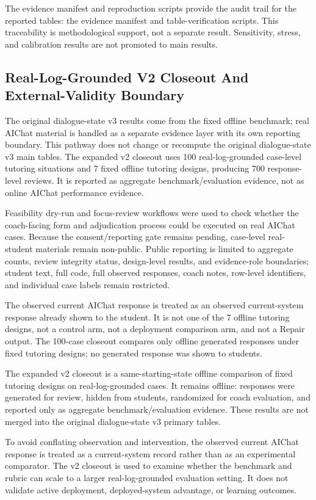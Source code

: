 \documentclass[11pt]{article}
\begin{document}
The evidence manifest and reproduction scripts provide the audit trail for the reported tables: the evidence manifest and table-verification scripts. This traceability is methodological support, not a separate result. Sensitivity, stress, and calibration results are not promoted to main results.

\subsection{Real-Log-Grounded V2 Closeout And External-Validity Boundary}

The original dialogue-state v3 results come from the fixed offline benchmark; real AIChat material is handled as a separate evidence layer with its own reporting boundary. This pathway does not change or recompute the original dialogue-state v3 main tables. The expanded v2 closeout uses 100 real-log-grounded case-level tutoring situations and 7 fixed offline tutoring designs, producing 700 response-level reviews. It is reported as aggregate benchmark/evaluation evidence, not as online AIChat performance evidence.

Feasibility dry-run and focus-review workflows were used to check whether the coach-facing form and adjudication process could be executed on real AIChat cases. Because the consent/reporting gate remains pending, case-level real-student materials remain non-public. Public reporting is limited to aggregate counts, review integrity status, design-level results, and evidence-role boundaries; student text, full code, full observed responses, coach notes, row-level identifiers, and individual case labels remain restricted.

The observed current AIChat response is treated as an observed current-system response already shown to the student. It is not one of the 7 offline tutoring designs, not a control arm, not a deployment comparison arm, and not a Repair output. The 100-case closeout compares only offline generated responses under fixed tutoring designs; no generated response was shown to students.

The expanded v2 closeout is a same-starting-state offline comparison of fixed tutoring designs on real-log-grounded cases. It remains offline: responses were generated for review, hidden from students, randomized for coach evaluation, and reported only as aggregate benchmark/evaluation evidence. These results are not merged into the original dialogue-state v3 primary tables.

To avoid conflating observation and intervention, the observed current AIChat response is treated as a current-system record rather than as an experimental comparator. The v2 closeout is used to examine whether the benchmark and rubric can scale to a larger real-log-grounded evaluation setting. It does not validate active deployment, deployed-system advantage, or learning outcomes.
\end{document}
